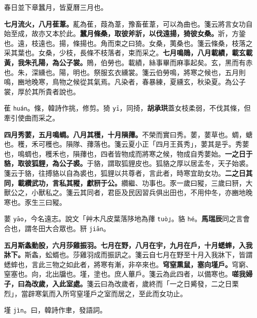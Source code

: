 \begin{quoting}春日並下章蠶月，皆夏曆三月也。\end{quoting}

\textbf{七月流火，八月萑葦。}{\footnotesize 薍為萑，葭為葦，豫畜萑葦，可以為曲也。箋云將言女功自始至成，故亦又本於此。}\textbf{蠶月條桑，取彼斧斨，以伐遠揚，猗彼女桑。}{\footnotesize 斨，方銎也。遠，枝遠也。揚，條揚也。角而束之曰猗。女桑，荑桑也。箋云條桑，枝落之采其葉也。女桑，少枝，長條不枝落者，束而采之。}\textbf{七月鳴鵙，八月載績，載玄載黃，我朱孔陽，為公子裳。}{\footnotesize 鵙，伯勞也。載績，絲事畢而麻事起矣。玄，黑而有赤也。朱，深纁也。陽，明也。祭服玄衣纁裳。箋云伯勞鳴，將寒之候也，五月則鳴，豳地晚寒，鳥物之候從其氣焉。凡染者，春暴練，夏纁玄，秋染夏。為公子裳，厚於其所貴者說也。}

\begin{quoting}萑 \texttt{huán}。條，韓詩作挑，修剪。猗 \texttt{yī}，同掎，\textbf{胡承珙}蓋女枝柔弱，不伐其條，但牽引使曲而采之。\end{quoting}

\textbf{四月秀葽，五月鳴蜩。八月其穫，十月隕蘀。}{\footnotesize 不榮而實曰秀。葽，葽草也。蜩，螗也。穫，禾可穫也。隕隊、蘀落也。箋云夏小正「四月王萯秀」，葽其是乎。秀葽也，鳴蜩也，穫禾也，隕蘀也，四者皆物成而將寒之候，物成自秀葽始。}\textbf{一之日于貉，取彼狐貍，為公子裘。}{\footnotesize 于貉，謂取狐貍皮也。狐貉之厚以居孟冬，天子始裘。箋云于貉，往搏貉以自為裘也，狐貍以共尊者，言此者，時寒宜助女功。}\textbf{二之日其同，載纘武功，言私其豵，獻豜于公。}{\footnotesize 纘繼、功事也。豕一歲曰豵，三歲曰豜，大獸公之，小獸私之。箋云其同者，君臣及民因習兵俱出田也，不用仲冬，亦豳地晚寒也。豕生三曰豵。}

\begin{quoting}葽 \texttt{yāo}，今名遠志。說文「艸木凡皮葉落陊地為蘀 \texttt{tuò}」。貉 \texttt{hé}。\textbf{馬瑞辰}同之言會合也，謂冬田大合眾也。豜 \texttt{jiān}。\end{quoting}

\textbf{五月斯螽動股，六月莎雞振羽。七月在野，八月在宇，九月在戶，十月蟋蟀，入我牀下。}{\footnotesize 斯螽，蚣蝑也。莎雞羽成而振訊之。箋云自七月在野至十月入我牀下，皆謂蟋蟀也，言此三物之如此者，將寒有漸，非卒來也。}\textbf{穹窒熏鼠，塞向墐戶。}{\footnotesize 穹窮、窒塞也。向，北出牖也。墐，塗也。庶人蓽戶。箋云為此四者，以備寒也。}\textbf{嗟我婦子，曰為改歲，入此室處。}{\footnotesize 箋云曰為改歲者，歲終而「一之日觱發，二之日栗烈」，當辟寒氣而入所穹窒墐戶之室而居之，至此而女功止。}

\begin{quoting}墐 \texttt{jìn}。曰，韓詩作聿，發語詞。\end{quoting}

